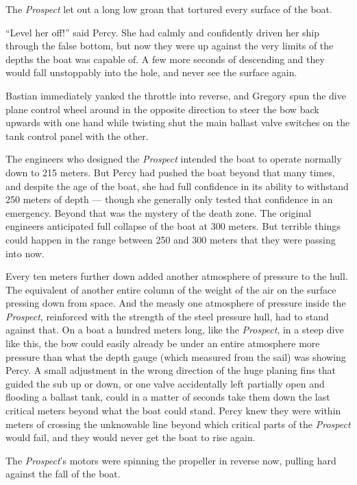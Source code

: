 \documentclass[
]{scrbook}
\begin{document}
The \emph{Prospect} let out a long low groan that tortured every surface
of the boat.

``Level her off!'' said Percy. She had calmly and confidently driven her
ship through the false bottom, but now they were up against the very
limits of the depths the boat was capable of. A few more seconds of
descending and they would fall unstoppably into the hole, and never see
the surface again.

Bastian immediately yanked the throttle into reverse, and Gregory spun
the dive plane control wheel around in the opposite direction to steer
the bow back upwards with one hand while twisting shut the main ballast
valve switches on the tank control panel with the other.

The engineers who designed the \emph{Prospect} intended the boat to
operate normally down to 215 meters. But Percy had pushed the boat
beyond that many times, and despite the age of the boat, she had full
confidence in its ability to withstand 250 meters of depth --- though
she generally only tested that confidence in an emergency. Beyond that
was the mystery of the death zone. The original engineers anticipated
full collapse of the boat at 300 meters. But terrible things could
happen in the range between 250 and 300 meters that they were passing
into now.

Every ten meters further down added another atmosphere of pressure to
the hull. The equivalent of another entire column of the weight of the
air on the surface pressing down from space. And the measly one
atmosphere of pressure inside the \emph{Prospect}, reinforced with the
strength of the steel pressure hull, had to stand against that. On a
boat a hundred meters long, like the \emph{Prospect}, in a steep dive
like this, the bow could easily already be under an entire atmosphere
more pressure than what the depth gauge (which measured from the sail)
was showing Percy. A small adjustment in the wrong direction of the huge
planing fins that guided the sub up or down, or one valve accidentally
left partially open and flooding a ballast tank, could in a matter of
seconds take them down the last critical meters beyond what the boat
could stand. Percy knew they were within meters of crossing the
unknowable line beyond which critical parts of the \emph{Prospect} would
fail, and they would never get the boat to rise again.

The \emph{Prospect}'s motors were spinning the propeller in reverse now,
pulling hard against the fall of the boat.
\end{document}
